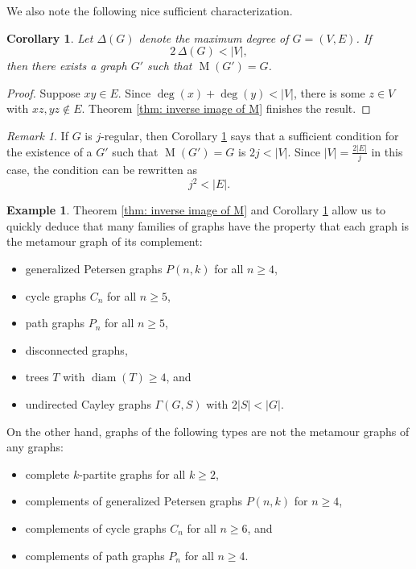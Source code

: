 \documentclass[12pt]{amsart}
\newtheorem{corollary}[theorem]{Corollary}
\theoremstyle{definition}
\newtheorem{example}[theorem]{Example}
\theoremstyle{remark}
\newtheorem{remark}[theorem]{Remark}
\numberwithin{equation}{section}
\numberwithin{figure}{section}
\newcommand{\M}{\operatorname{M}}
\newcommand{\diam}{\operatorname{diam}}
\begin{document}

We also note the following nice sufficient characterization.

\begin{corollary} \label{cor: meta of completment by deg < 1/2 V}
    Let $\Delta(G)$ denote the maximum degree of $G=(V,E)$.
    If 
    \[ 2\, \Delta(G) < |V|,\] 
    then there exists a graph $G'$ such that $\M(G')=G$.
\end{corollary}

\begin{proof}
    Suppose $xy \in E$. Since $\deg(x) + \deg(y)  < |V|$, there is some $z \in V$ with $xz,yz \notin E$. Theorem \ref{thm: inverse image of M} finishes the result.
\end{proof}

\begin{remark}
    If $G$ is $j$-regular, then Corollary \ref{cor: meta of completment by deg < 1/2 V} says that a sufficient condition for the existence of a $G'$ such that $\M(G')=G$ is $2j < |V|$. Since $|V| = \frac{2|E|}{j}$ in this case, the condition can be rewritten as 
    \[ j^2 < |E|.\]
\end{remark}

\begin{example}
    Theorem \ref{thm: inverse image of M} and Corollary \ref{cor: meta of completment by deg < 1/2 V} allow us to quickly deduce that many families of graphs have the property that each graph is the metamour graph of its complement:
    \begin{itemize}
        \item generalized Petersen graphs $P(n,k)$ for all $n\ge 4$,
        \item cycle graphs $C_n$ for all $n\ge 5$,
        \item path graphs $P_n$ for all $n\ge 5$,
        \item disconnected graphs,
        \item trees $T$ with $\diam(T)\ge 4$, and
        \item undirected Cayley graphs $\Gamma(G,S)$ with $2|S| < |G|$.%
    \end{itemize}
    On the other hand, graphs of the following types are not the metamour graphs of any graphs:
    \begin{itemize}
        \item complete $k$-partite graphs for all $k\ge 2$,
        \item complements of generalized Petersen graphs $P(n,k)$ for $n\ge 4$,
        \item complements of cycle graphs $C_n$  for all $n\ge 6$, and
        \item complements of path graphs $P_n$ for all $n\ge 4$.
    \end{itemize}
\end{example}
\end{document}
